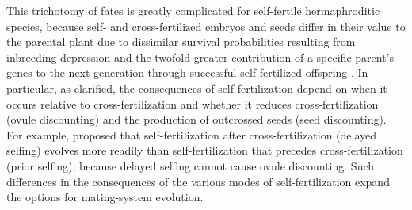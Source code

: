 \documentclass[letterpaper,titlepage]{scrartcl}
\begin{document}
This trichotomy of fates is greatly complicated for self-fertile
hermaphroditic species, because self- and cross-fertilized embryos and
seeds differ in their value to the parental plant due to dissimilar
survival probabilities resulting from inbreeding depression
\citep{Charlesworth87} and the twofold greater contribution of a
specific parent's genes to the next generation through successful
self-fertilized offspring \citep{Fisher41}. In particular, as
\citet{Lloyd79,Lloyd92a} clarified, the consequences of
self-fertilization depend on when it occurs relative to
cross-fertilization and whether it reduces cross-fertilization (ovule
discounting) and the production of outcrossed seeds (seed
discounting). For example, \citet{Lloyd92a} proposed that
self-fertilization after cross-fertilization (delayed selfing) evolves
more readily than self-fertilization that precedes cross-fertilization
(prior selfing), because delayed selfing cannot cause ovule
discounting. Such differences in the consequences of the various modes
of self-fertilization expand the options for mating-system evolution.
\end{document}
